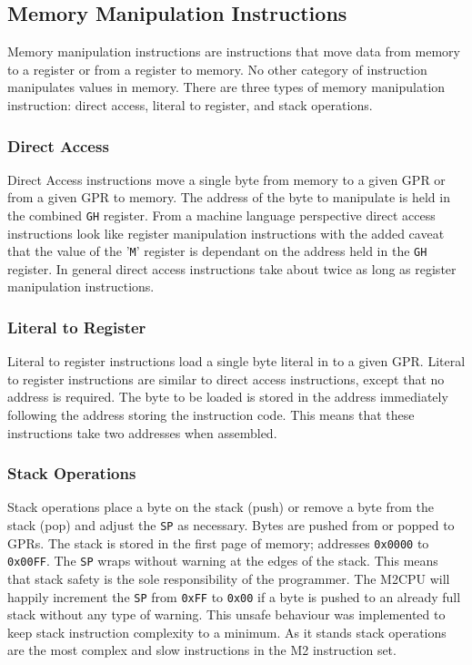 \documentclass[a4paper,12pt]{article}
\newcommand{\mt}{M2CPU}
\newcommand{\mi}{M2 instruction set}
\newcommand{\Gr}{\texttt{G}}
\newcommand{\Hr}{\texttt{H}}
\newcommand{\SP}{\texttt{SP}}
\begin{document}
\subsection{Memory Manipulation Instructions}
Memory manipulation instructions are instructions that move data from memory to a 
register or from a register to memory. No other category of instruction 
manipulates values in memory. There are three types of memory manipulation 
instruction: direct access, literal to register, and stack operations.
\par

\subsubsection{Direct Access}
Direct Access instructions move a single byte from memory to a given GPR or 
from a given GPR to memory. The address of the byte to manipulate is held in 
the combined \Gr{}\Hr{} register. From a machine language perspective direct 
access instructions look like register manipulation instructions with the added
caveat that the value of the '\texttt{M}' register is dependant on the address
held in the \Gr{}\Hr{} register. In general direct access instructions take 
about twice as long as register manipulation instructions.
\par

\subsubsection{Literal to Register}
Literal to register instructions load a single byte literal in to a given GPR.
Literal to register instructions are similar to direct access instructions,
except that no address is required. The byte to be loaded is stored in the
address immediately following the address storing the instruction code. This
means that these instructions take two addresses when assembled.
\par

\subsubsection{Stack Operations}
Stack operations place a byte on the stack (push) or remove a byte from the
stack (pop) and adjust the \SP{} as necessary. Bytes are pushed from or popped
to GPRs. The stack is stored in the first page of memory; addresses 
\texttt{0x0000} to \texttt{0x00FF}. The \SP{} wraps without warning at the edges
of the stack. This means that stack safety is the sole responsibility of the 
programmer. The \mt{} will happily increment the \SP{} from \texttt{0xFF} to
\texttt{0x00} if a byte is pushed to an already full stack without any type of
warning. This unsafe behaviour was implemented to keep stack instruction 
complexity to a minimum. As it stands stack operations are the most complex and
slow instructions in the \mi{}.
\par
\end{document}

